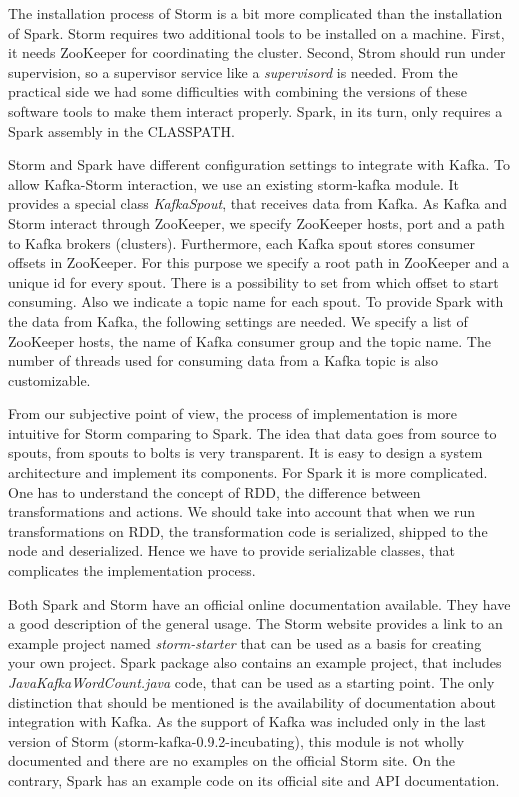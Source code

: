 The installation process of Storm is a bit more complicated than the installation of Spark.
Storm requires two additional tools to be installed on a machine.
First, it needs ZooKeeper for coordinating the cluster.
Second, Strom should run under supervision, so a supervisor service like a \textit{supervisord} is needed.
From the practical side we had some difficulties with combining the versions of these software tools to make them interact properly.
Spark, in its turn, only requires a Spark assembly in the CLASSPATH.

Storm and Spark have different configuration settings to integrate with Kafka.
To allow Kafka-Storm interaction, we use an existing storm-kafka module.
It provides a special class \textit{KafkaSpout}, that receives data from Kafka.
As Kafka and Storm interact through ZooKeeper, we specify ZooKeeper hosts, port and a path to Kafka brokers (clusters).
Furthermore, each Kafka spout stores consumer offsets in ZooKeeper.
For this purpose we specify a root path in ZooKeeper and a unique id for every spout.
There is a possibility to set from which offset to start consuming.
Also we indicate a topic name for each spout.
To provide Spark with the data from Kafka, the following settings are needed.
We specify a list of ZooKeeper hosts, the name of Kafka consumer group and the topic name.
The number of threads used for consuming data from a Kafka topic is also customizable.

From our subjective point of view, the process of implementation is more intuitive for Storm comparing to Spark.
The idea that data goes from source to spouts, from spouts to bolts is very transparent.
It is easy to design a system architecture and implement its components.
For Spark it is more complicated.
One has to understand the concept of RDD, the difference between transformations and actions.
We should take into account that when we run transformations on RDD, the transformation code is serialized, shipped to the node and deserialized.
Hence we have to provide serializable classes, that complicates the implementation process.

Both Spark and Storm have an official online documentation available.
They have a good description of the general usage.
The Storm website provides a link to an example project named \textit{storm-starter} that can be used as a basis for creating your own project.
Spark package also contains an example project, that includes \textit{JavaKafkaWordCount.java} code, that can be used as a starting point. 
The only distinction that should be mentioned is the availability of documentation about integration with Kafka.
As the support of Kafka was included only in the last version of Storm (storm-kafka-0.9.2-incubating), this module is not wholly documented and there are no examples on the official Storm site.
On the contrary, Spark has an example code on its official site and API documentation. 

